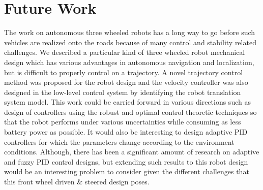 \documentclass[conference]{IEEEtran}
\begin{document}
\section{Future Work}
The work on autonomous three wheeled robots has a long way to go before such vehicles are realized onto the roads because of many control and stability related challenges. We described a particular kind of three wheeled robot mechanical design which has various advantages in autonomous navigation and localization, but is difficult to properly control on a trajectory. A novel trajectory control method was proposed for the robot design and the velocity controller was also designed in the low-level control system by identifying the robot translation system model. This work could be carried forward in various directions such as design of controllers using the robust and optimal control theoretic techniques so that the robot performs under various uncertainties while consuming as less battery power as possible. It would also be interesting to design adaptive PID controllers for which the parameters change according to the environment conditions. Although, there has been a significant amount of research on adaptive and fuzzy PID control designs, but extending such results to this robot design would be an interesting problem to consider given the different challenges that this front wheel driven \& steered design poses.  

 



%
%
\end{document}
